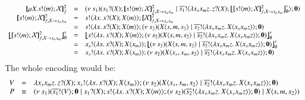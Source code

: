 \[
	\begin{array}{rcl}
		\pmapp{\recp{X}{\bout{s}{m} \rvar{X}}}{2}{f} & = &
		\newsp{s_1}{ \binp{s_1}{X} \pmapp{\bout{s}{m} \rvar{X}}{2}{f, \rvar{X} \rightarrow x_ax_m} \Par \bout{\dual{s_1}}{ \abs{x_s x_m z} \binp{z}{X} \auxmapp{\pmapp{\bout{s}{m} \rvar{X}}{2}{f, \rvar{X} \rightarrow x_ax_m}}{v}{\es} } \inact}
		\\

		\pmapp{\bout{s}{m} \rvar{X}}{2}{f, \rvar{X} \rightarrow x_ax_m} &=&
		\bout{s}{\abs{x}{\binp{x}{X} \appl{X}{m}}} \pmapp{\rvar{X}}{2}{f, \rvar{X} \rightarrow x_ax_m}
		\\
		&=& \bout{s}{\abs{x}{\binp{x}{X} \appl{X}{m}}} \newsp{s_2}{\appl{X}{s,m, s_2}  \Par \bout{\dual{s_2}}{\abs{x_s x_m z}{\appl{X}{x_s x_m z}}} \inact}
		\\

		\auxmapp{\pmapp{\bout{s}{m} \rvar{X}}{2}{f, \rvar{X} \rightarrow x_ax_m}}{v}{\es} &=&
		\auxmapp{\bout{s}{\abs{x}{\binp{x}{X} \appl{X}{m}}} \newsp{s_2}{\appl{X}{s,m, s_2}  \Par \bout{\dual{s_2}}{\abs{x_s x_m z}{\appl{X}{x_s x_m z}}} \inact}}{v}{\es}
		\\

		& = & \bout{x_s}{\abs{x}{\binp{x}{X} \appl{X}{x_m}}} \auxmapp{\newsp{s_2}{\appl{X}{s,m, s_2}  \Par \bout{\dual{s_2}}{\abs{x_s x_m z}{\appl{X}{x_s x_m z}}} \inact}}{v}{\es}
		\\
		& = & \bout{x_s}{\abs{x}{\binp{x}{X} \appl{X}{x_m}}} \newsp{s_2}{\appl{X}{x_s,x_m, s_2}  \Par \bout{\dual{s_2}}{\abs{x_s x_m z}{\appl{X}{x_s x_m z}}} \inact}
	\end{array}
\]
\noi The whole encoding would be:
\[
	\begin{array}{rcl}
		V & = & \lambda x_s x_m z.\,z ? (X) ; x_s ! \langle \lambda x.\,x ? (X) ; X\langle x_m \rangle \rangle ; (\nu\ s_2)(X\langle x_s,x_m, s_2 \rangle  \;|\; \overline{s_2} ! \langle \lambda x_s x_m z.\,X\langle x_s x_m z \rangle \rangle ; \mathbf{0})\\
		P & \equiv &
		(\nu\ s_1)(\overline{s_1} ! \langle V \rangle ; \mathbf{0} \;|\; s_1 ? (X) ; s ! \langle \lambda x.\,x ? (X) ; X\langle m \rangle \rangle ; (\nu\ s_2)(\overline{s_2} ! \langle \lambda x_s x_m z.\,X\langle x_s x_m z \rangle \rangle ; \mathbf{0}) \;|\; X\langle s,m, s_2 \rangle)
	\end{array}
\]

